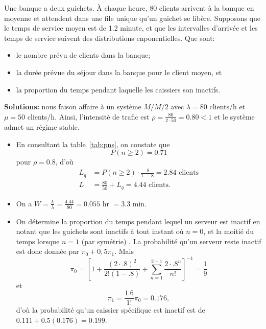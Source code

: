 \begin{Exemple} Une banque a deux guichets. \`A chaque heure, 80 clients arrivent à la banque en moyenne et attendent dans une file unique qu'un guichet se libère. Supposons que le temps de service moyen est de 1.2 minute, et que les intervalles d'arrivée et les temps de service suivent des distributions enponentielles. Que sont:
\begin{itemize}[noitemsep]
	\item[(a)] le nombre prévu de clients dans la banque;
	\item[(b)] la durée prévue du séjour dans la banque pour le client moyen, et
	\item[(c)] la proportion du temps pendant laquelle les caissiers son inactifs.
\end{itemize}
\textbf{Solutions:} nous faison affaire à un système $M/M/2$ avec $\lambda =80 $ clients/h et $\mu = 50 $ clients/h. Ainsi, l'intensité de trafic est $\rho = \frac{80}{2\cdot 50} = 0.80 < 1$ et le système admet un régime stable. \begin{itemize}[noitemsep]
	\item[(a)] En consultant la table~\ref{tab:pns}, on constate que $$P(n \geq 2) = 0.71$$ pour $\rho=0.8$, d'où 
\begin{align*} L_{q} &= P( n \geq 2)\cdot \frac{.8}{1-.8} = 2.84 \text{ clients}\\
L& = 	\frac{80}{50} + L_{q}	= 4.44 \text{ clients.} \end{align*}
\item[(b)]	On a $W = \frac{L}{\lambda} = \frac{4.44}{80} = 0.055 \text{ hr }= 3.3 $ min.
\item[(c)] On détermine la proportion du temps pendant lequel un serveur est inactif en notant que les guichets sont inactifs à tout instant où $n=0 $, et la moitié du temps lorsque $n = 1$ (par symétrie) . La probabilité qu'un serveur reste inactif est donc donnée par $ \pi_{0} + 0,5 \pi_{1}$. Mais
 $$\pi_{0} = \left[1 + \frac{\left(2\cdot .8\right)^{2}}{2! \left(1-.8\right)} + \sum^{2-1}_{n=1} \frac{2\cdot .8^{n}}{n!}\right]^{-1}= \frac{1}{9}$$ et $$\pi_{1} = \frac{1.6}{1!} \pi_{0} = 0.176,$$ d'où la probabilité qu'un caissier spécifique est inactif est de $0.111 + 0.5(0.176) = 0.199$.
\end{itemize}
\end{Exemple}
